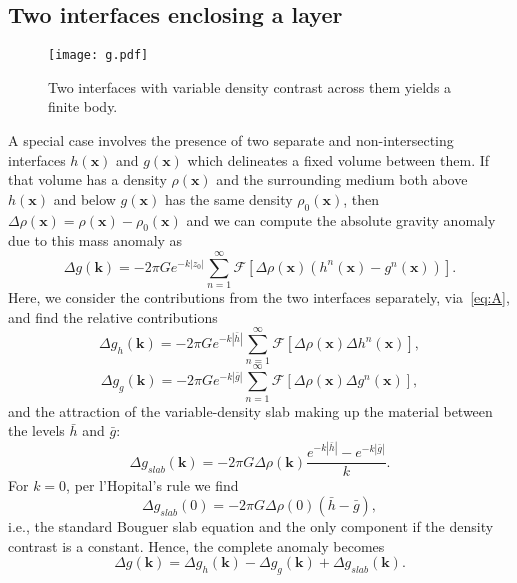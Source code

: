 \documentclass[12pt,letterpaper,margin=0.5in]{report}
\begin{document}
\subsection*{Two interfaces enclosing a layer}
\begin{figure}[h!]
  \centering
  \texttt{[image: g.pdf]}
  \caption{Two interfaces with variable density contrast across them yields a finite body.}
\end{figure}

A special case involves the presence of two separate and non-intersecting interfaces $h(\mathbf{x})$ and $g(\mathbf{x})$ which delineates a
fixed volume between them.  If that volume has a density $\rho(\mathbf{x})$ and the surrounding medium both
above $h(\mathbf{x})$ and below $g(\mathbf{x})$ has the same density $\rho_0(\mathbf{x})$, then $\Delta \rho(\mathbf{x}) = \rho(\mathbf{x}) - \rho_0(\mathbf{x})$
and we can compute the absolute gravity anomaly due to this mass anomaly as
\begin{equation}
\Delta g(\mathbf{k}) = -2\pi G e^{-k|z_0|} \sum_{n=1}^\infty \mathcal{F} \left [ \Delta \rho(\mathbf{x}) \left (h^n(\mathbf{x}) - g^n(\mathbf{x})  \right) \right ].
\end{equation}
Here, we consider the contributions from the two interfaces separately, via~\ref{eq:A}, and find the relative contributions
\begin{equation}
\Delta g_h(\mathbf{k}) = -2\pi G e^{-k|\bar{h}|} \sum_{n=1}^\infty \mathcal{F} \left [ \Delta \rho(\mathbf{x}) \Delta h^n(\mathbf{x}) \right ],
\label{eq:h}
\end{equation}
\begin{equation}
\Delta g_g(\mathbf{k}) = -2\pi G e^{-k|\bar{g}|} \sum_{n=1}^\infty \mathcal{F} \left [ \Delta \rho(\mathbf{x}) \Delta g^n(\mathbf{x}) \right ],
\label{eq:g}
\end{equation}
and the attraction of the variable-density slab making up the material between the levels $\bar{h}$ and $\bar{g}$:
\begin{equation}
\Delta g_{slab}(\mathbf{k}) = -2\pi G \Delta \rho(\mathbf{k}) \frac{e^{-k|\bar{h}|} - e^{-k|\bar{g}|}}{k}.
\label{eq:sl}
\end{equation}
For $k = 0$, per l'Hopital's rule we find 
\begin{equation}
\Delta g_{slab}(0) = -2\pi G \Delta \rho(0) \left (\bar{h} - \bar{g} \right),
\label{eq:sl}
\end{equation}
i.e., the standard Bouguer slab equation and the only component if the density contrast is a constant.  Hence, the complete anomaly becomes
\begin{equation}
\Delta g(\mathbf{k}) = \Delta g_h(\mathbf{k}) - \Delta g_g(\mathbf{k}) + \Delta g_{slab}(\mathbf{k}).
\label{q:total}
\end{equation}
\end{document}
